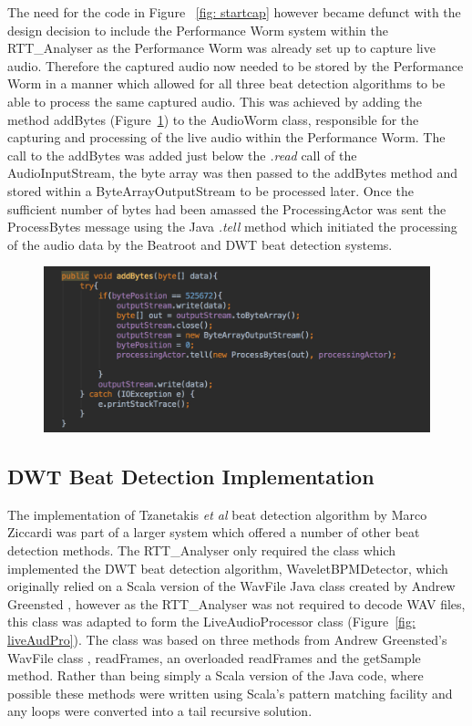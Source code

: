 \documentclass[a4paper, 11pt]{article}
\begin{document}
The need for the code in Figure ~\ref{fig: startcap} however became defunct with the design decision to include the Performance Worm system within the RTT\_Analyser as the Performance Worm was already set up to capture live audio. Therefore the captured audio now needed to be stored by the Performance Worm in a manner which allowed for all three beat detection algorithms to be able to process the same captured audio. This was achieved by adding the method addBytes (Figure~\ref{fig: addBytes}) to the AudioWorm class, responsible for the capturing and processing of the live audio within the Performance Worm. The call to the addBytes was added just below the \textit{.read} call of the AudioInputStream, the byte array was then passed to the addBytes method and stored within a ByteArrayOutputStream to be processed later. Once the sufficient number of bytes had been amassed the ProcessingActor was sent the ProcessBytes message using the Java \textit{.tell} method which initiated the processing of the audio data by the Beatroot and DWT beat detection systems.

\begin{figure}[ht]
	\centering
	\includegraphics[scale=0.25]{images/addBytes.jpg}
	\caption{}
	\label{fig: addBytes}
\end{figure}

\subsection{DWT Beat Detection Implementation}
The implementation of Tzanetakis \textit{et al} beat detection algorithm by Marco Ziccardi \cite{marcoZin} was part of a larger system which offered a number of other beat detection methods. The RTT\_Analyser only required the class which implemented the DWT beat detection algorithm, WaveletBPMDetector, which originally relied on a Scala version of the WavFile Java class created by Andrew Greensted \cite{green}, however as the RTT\_Analyser was not required to decode WAV files, this class was adapted to form the LiveAudioProcessor class (Figure~\ref{fig: liveAudPro}). The class was based on three methods from Andrew Greensted's WavFile class \cite{green}, readFrames, an overloaded readFrames and the getSample method. Rather than being simply a Scala version of the Java code, where possible these methods were written using Scala's pattern matching facility and any loops were converted into a tail recursive solution.\par
\end{document}
